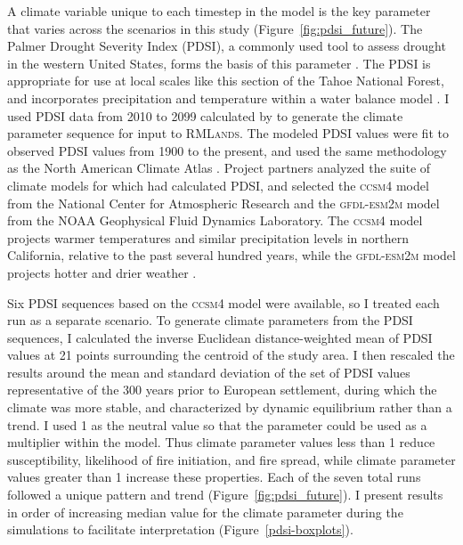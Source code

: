 A climate variable unique to each timestep in the model is the key parameter that varies across the scenarios in this study (Figure~\ref{fig:pdsi_future}). The Palmer Drought Severity Index (PDSI), a commonly used tool to assess drought in the western United States, forms the basis of this parameter \citep{Cook2004,Cook2004}. The PDSI is appropriate for use at local scales like this section of the Tahoe National Forest, and incorporates precipitation and temperature within a water balance model \citep{HeimJr2002}. I used PDSI data from 2010 to 2099 calculated by \citet{Cook2014} to generate the climate parameter sequence for input to \textsc{RMLands}. The \citet{Cook2014} modeled PDSI values were fit to observed PDSI values from 1900 to the present, and used the same methodology as the North American Climate Atlas \citep{Cook2004}. Project partners analyzed the suite of climate models for which \citet{Cook2014} had calculated PDSI, and selected the \textsc{ccsm4} model from the National Center for Atmospheric Research and the \textsc{gfdl-esm2m} model from the NOAA Geophysical Fluid Dynamics Laboratory. The \textsc{ccsm4} model projects warmer temperatures and similar precipitation levels in northern California, relative to the past several hundred years, while the \textsc{gfdl-esm2m} model projects hotter and drier weather \citep{Weiss2013}.

Six PDSI sequences based on the \textsc{ccsm4} model were available, so I treated each run as a separate scenario. To generate climate parameters from the PDSI sequences, I calculated the inverse Euclidean distance-weighted mean of PDSI values at 21 points surrounding the centroid of the study area. I then rescaled the results around the mean and standard deviation of the set of PDSI values representative of the 300 years prior to European settlement, during which the climate was more stable, and characterized by dynamic equilibrium rather than a trend. \citep{Cook2004} I used 1 as the neutral value so that the parameter could be used as a multiplier within the model. Thus climate parameter values less than 1 reduce susceptibility, likelihood of fire initiation, and fire spread, while climate parameter values greater than 1 increase these properties. Each of the seven total runs followed a unique pattern and trend (Figure~\ref{fig:pdsi_future}). I present results in order of increasing median value for the climate parameter during the simulations to facilitate interpretation (Figure~\ref{pdsi-boxplots}). %


